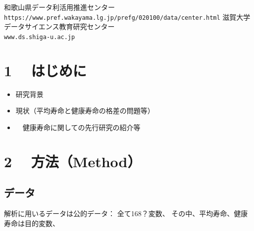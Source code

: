 \documentclass[a4j,11pt,mc, twocolumn]{jreport}
\newcommand{\tb}[1]{\textcolor{blue}{#1}} %
\begin{document}


{和歌山県データ利活用推進センター\\\texttt{https://www.pref.wakayama.lg.jp/prefg/020100/data/center.html}}
{滋賀大学データサイエンス教育研究センター\\ \texttt{www.ds.shiga-u.ac.jp}}

\tableofcontents
\thispagestyle{empty}
\newpage

%

%

\chapter{1	　はじめに}

\begin{itemize}
	\item 研究背景　
	\item   現状（平均寿命と健康寿命の格差の問題等）
	\item 　健康寿命に関しての先行研究の紹介等
\end{itemize}



\chapter{2	　方法（Method）}
\section{データ}

解析に用いるデータは公的データ：
全て168？変数、
その中、平均寿命、健康寿命は目的変数、
\end{document}
